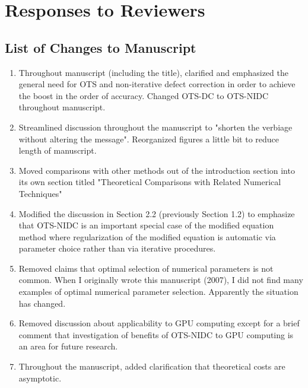 \documentclass[12pt]{article}
\begin{document}
\section*{Responses to Reviewers}

\subsection*{List of Changes to Manuscript}

\begin{enumerate}

\item Throughout manuscript (including the title), clarified and emphasized the
      general need for OTS and non-iterative defect correction in order to
      achieve the boost in the order of accuracy.  Changed OTS-DC to OTS-NIDC
      throughout manuscript.

\item Streamlined discussion throughout the manuscript to "shorten the verbiage
      without altering the message". Reorganized figures a little bit to reduce
      length of manuscript.

\item Moved comparisons with other methods out of the introduction section into
      its own section titled "Theoretical Comparisons with Related Numerical
      Techniques"

\item Modified the discussion in Section 2.2 (previously Section 1.2) to
      emphasize that OTS-NIDC is an important special case of the modified
      equation method where regularization of the modified equation is
      automatic via parameter choice rather than via iterative procedures.

\item Removed claims that optimal selection of numerical parameters is not 
      common.  When I originally wrote this manuscript (2007), I did not find
      many examples of optimal numerical parameter selection.  Apparently the
      situation has changed.

\item Removed discussion about applicability to GPU computing except for a
      brief comment that investigation of benefits of OTS-NIDC to GPU computing
      is an area for future research.

\item Throughout the manuscript, added clarification that theoretical costs are
      asymptotic.


\end{enumerate}
\end{document}
